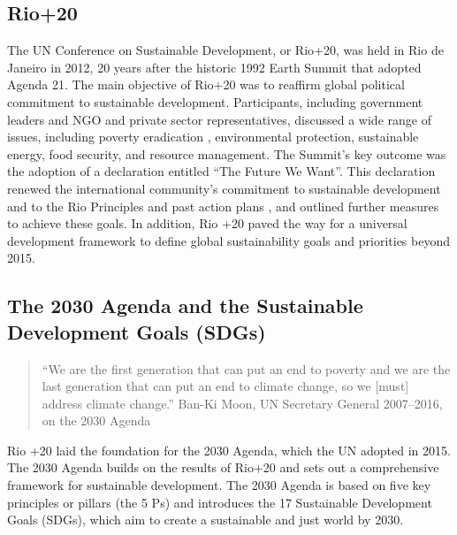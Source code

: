 \documentclass[
  a4paper,
  openany]{book}
\begin{document}
\subsection{Rio+20}\label{rio20}

The UN Conference on Sustainable Development, or Rio+20, was held in Rio
de Janeiro in 2012, 20 years after the historic 1992 Earth Summit that
adopted Agenda 21. The main objective of Rio+20 was to reaffirm global
political commitment to sustainable development. Participants, including
government leaders and NGO and private sector representatives, discussed
a wide range of issues, including poverty eradication , environmental
protection, sustainable energy, food security, and resource management.
The Summit's key outcome was the adoption of a declaration entitled
``The Future We Want''. This declaration renewed the international
community's commitment to sustainable development and to the Rio
Principles and past action plans , and outlined further measures to
achieve these goals. In addition, Rio +20 paved the way for a universal
development framework to define global sustainability goals and
priorities beyond 2015.

\subsection{The 2030 Agenda and the Sustainable Development Goals
(SDGs)}\label{the-2030-agenda-and-the-sustainable-development-goals-sdgs}

\begin{quote}
``We are the first generation that can put an end to poverty and we are
the last generation that can put an end to climate change, so we
{[}must{]} address climate change.'' Ban-Ki Moon, UN Secretary General
2007--2016, on the 2030 Agenda
\end{quote}

Rio +20 laid the foundation for the 2030 Agenda, which the UN adopted in
2015. The 2030 Agenda builds on the results of Rio+20 and sets out a
comprehensive framework for sustainable development. The 2030 Agenda is
based on five key principles or pillars (the 5 Ps) and introduces the 17
Sustainable Development Goals (SDGs), which aim to create a sustainable
and just world by 2030.
\end{document}
